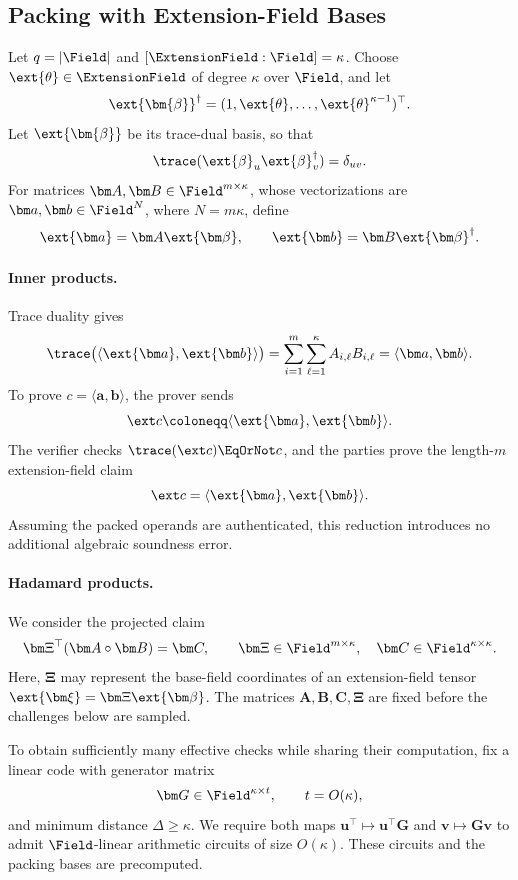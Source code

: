 \subsection{Packing with Extension-Field Bases}

Let \(q=|\Field|\) and
\([\ExtensionField:\Field]=\kappa\).
Choose \(\ext{\theta}\in\ExtensionField\) of degree
\(\kappa\) over \(\Field\), and let
\[
    \ext{\bm{\beta}}^\dagger
    =(1,\ext{\theta},\ldots,\ext{\theta}^{\kappa-1})^\top.
\]
Let \(\ext{\bm{\beta}}\) be its trace-dual basis, so that
\[
    \trace(\ext{\beta}_u\ext{\beta}_v^\dagger)
    =\delta_{uv}.
\]
For matrices \(\bm A,\bm B\in\Field^{m\times\kappa}\),
whose vectorizations are
\(\bm a,\bm b\in\Field^N\), where \(N=m\kappa\), define
\[
    \ext{\bm a}=\bm A\ext{\bm\beta},
    \qquad
    \ext{\bm b}=\bm B\ext{\bm\beta}^\dagger.
\]

\paragraph{Inner products.}
Trace duality gives
\[
    \trace\bigl(
        \langle\ext{\bm a},\ext{\bm b}\rangle
    \bigr)
    =
    \sum_{i=1}^{m}\sum_{\ell=1}^{\kappa}
        A_{i,\ell}B_{i,\ell}
    =
    \langle\bm a,\bm b\rangle.
\]
To prove \(c=\langle\bm a,\bm b\rangle\), the prover sends
\[
    \ext c
    \coloneqq
    \langle\ext{\bm a},\ext{\bm b}\rangle.
\]
The verifier checks \(\trace(\ext c)\EqOrNot c\), and the
parties prove the length-\(m\) extension-field claim
\[
    \ext c
    =
    \langle\ext{\bm a},\ext{\bm b}\rangle.
\]
Assuming the packed operands are authenticated, this
reduction introduces no additional algebraic soundness error.

\paragraph{Hadamard products.}
We consider the projected claim
\[
    \bm\Xi^\top(\bm A\circ\bm B)=\bm C,
    \qquad
    \bm\Xi\in\Field^{m\times\kappa},
    \quad
    \bm C\in\Field^{\kappa\times\kappa}.
\]
Here, \(\bm\Xi\) may represent the base-field coordinates
of an extension-field tensor
\(\ext{\bm\xi}=\bm\Xi\ext{\bm\beta}\).
The matrices \(\bm A,\bm B,\bm C,\bm\Xi\) are fixed before
the challenges below are sampled.

To obtain sufficiently many effective checks while
sharing their computation, fix a linear code with generator
matrix
\[
    \bm G\in\Field^{\kappa\times t},
    \qquad
    t=O(\kappa),
\]
and minimum distance \(\Delta\geq\kappa\).
We require both maps
\(\bm u^\top\mapsto\bm u^\top\bm G\) and
\(\bm v\mapsto\bm G\bm v\) to admit
\(\Field\)-linear arithmetic circuits of size \(O(\kappa)\).
These circuits and the packing bases are precomputed.

